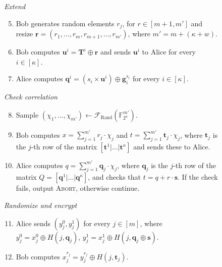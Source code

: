 \begin{figure}
\begin{tcolorbox}
    \textit{\hspace{0.25cm} Extend}
    \begin{enumerate}
    \setcounter{enumi}{4}
        \item Bob generates random elements $r_j$, for $r\in [m+1, m']$ and resize $\boldsymbol{r} = (r_1, ..., r_m, r_{m+1}, ..., r_{m'})$, where $m' = m + (\kappa + w)$.
        \item Bob computes $\boldsymbol{u}^i = \boldsymbol{T}^i \oplus \boldsymbol{r}$ and sends $\boldsymbol{u}^i$ to Alice for every $i\in[\kappa]$.
        \item Alice computes $\boldsymbol{q}^i = (s_i \times \boldsymbol{u}^i) \oplus \boldsymbol{g}^{s_i}_i$ for every $i\in[\kappa]$.
    \end{enumerate}
    \textit{\hspace{0.25cm} Check correlation}
    \begin{enumerate}
    \setcounter{enumi}{7}
        \item Sample $(\chi_1, ..., \chi_{m'})\leftarrow \mathcal{F}_{\text{Rand}}(\mathbb{F}^{m'}_{2^\kappa})$.
        \item Bob computes $x = \sum_{j=1}^{m'} r_j \cdot \chi_j$ and $t = \sum_{j=1}^{m'} \boldsymbol{t}_j \cdot \chi_j$, where $\boldsymbol{t}_j$ is the $j$-th row of the matrix $[ \boldsymbol{t}^1 | ...| \boldsymbol{t}^\kappa]$ and sends these to Alice.
        \item Alice computes $q = \sum_{j=1}^{m'} \boldsymbol{q}_j \cdot \chi_j$, where $\boldsymbol{q}_j$ is the $j$-th row of the matrix $Q = [ \boldsymbol{q}^1 | ...| \boldsymbol{q}^\kappa]$, and checks that $t = q + r\cdot \boldsymbol{s}$. If the check fails, output \textsc{Abort}, otherwise continue. %
    \end{enumerate} 
    
    \textit{\hspace{0.25cm} Randomize and encrypt}
    \begin{enumerate}
    \setcounter{enumi}{10}
        \item Alice sends $(y^0_j, y^1_j)$ for every $j\in[m]$, where $y^0_j = x^0_j\oplus H(j,\boldsymbol{q}_j)$, $y^1_j = x^1_j\oplus H(j,\boldsymbol{q}_j\oplus \boldsymbol{s})$. %
        \item Bob computes $x^{r_j}_j = y^{r_j}_j \oplus H(j, \boldsymbol{t}_j)$.
    \end{enumerate} 
    

\end{tcolorbox}
\end{figure}
